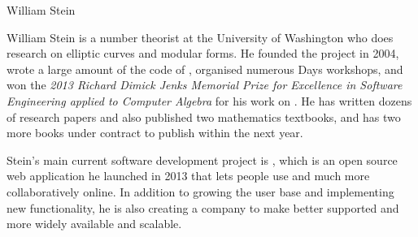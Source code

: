 \begin{participant}[type=R,PM=0,salary=9000,gender=male]{William Stein}

William Stein is a number theorist at the University of Washington
who does research on elliptic curves and modular forms.
He founded the \Sage project in 2004, wrote a large
amount of the code of \Sage, organised numerous \Sage Days workshops,
and won the {\em 2013 Richard Dimick Jenks
Memorial Prize for Excellence in
Software Engineering applied to Computer Algebra} for his work on \Sage.
He has written dozens of research papers and
also published two mathematics textbooks, and has two more books
under contract to publish within the next year.

Stein's main current software development project is \SMC,
which is an open source web application he launched in 2013
that lets people use \Sage and much more collaboratively online.
In addition to growing the user base and implementing
new functionality, he is also creating a company to make
\SMC better supported and
more widely available and scalable.

\end{participant}
